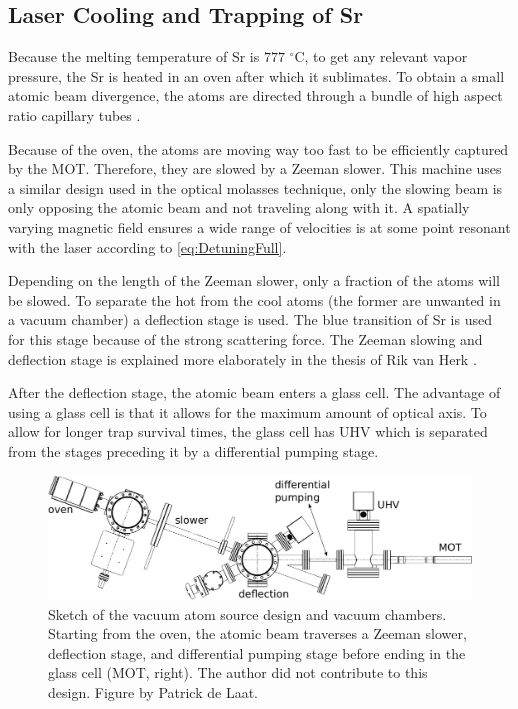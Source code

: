 \subsection{Laser Cooling and Trapping of Sr}

Because the melting temperature of Sr is $777$ ${}^{\circ}$C, to get any relevant vapor pressure, the Sr is heated in an oven after which it sublimates. To obtain a small atomic beam divergence, the atoms are directed through a bundle of high aspect ratio capillary tubes \cite{Stellmer2013}. 

Because of the oven, the atoms are moving way too fast to be efficiently captured by the MOT. Therefore, they are slowed by a Zeeman slower. This machine uses a similar design used in the optical molasses technique, only the slowing beam is only opposing the atomic beam and not traveling along with it. A spatially varying magnetic field ensures a wide range of velocities is at some point resonant with the laser according to \cref{eq:DetuningFull}. 

Depending on the length of the Zeeman slower, only a fraction of the atoms will be slowed. To separate the hot from the cool atoms (the former are unwanted in a vacuum chamber) a deflection stage is used. The blue transition of Sr is used for this stage because of the strong scattering force. The Zeeman slowing and deflection stage is explained more elaborately in the thesis of Rik van Herk \cite{Herk2022}.

After the deflection stage, the atomic beam enters a glass cell. The advantage of using a glass cell is that it allows for the maximum amount of optical axis. To allow for longer trap survival times, the glass cell has \ac{UHV} which is separated from the stages preceding it by a differential pumping stage. 

\begin{figure}
	\centering
	\includegraphics[width=0.8\linewidth]{figures/SrLoading.pdf}
	\caption{Sketch of the vacuum atom source design and vacuum chambers. Starting from the oven, the atomic beam traverses a Zeeman slower, deflection stage, and differential pumping stage before ending in the glass cell (MOT, right). The author did not contribute to this design. Figure by Patrick de Laat.}
	\label{fig:SrLoading}
\end{figure}


